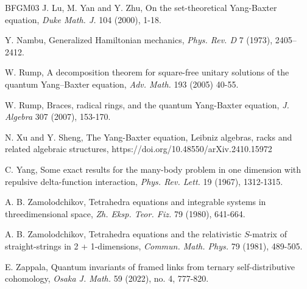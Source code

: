 \documentclass[a4paper,reqno,10pt]{amsart}
\theoremstyle{plain}
\theoremstyle{definition}
\theoremstyle{remark}
\begin{document}
\begin{thebibliography}{BFGM03}
 J. Lu, M. Yan and Y. Zhu, On the set-theoretical Yang-Baxter equation, {\em Duke Math. J.} 104 (2000), 1-18.

 Y. Nambu, Generalized Hamiltonian mechanics, {\em Phys. Rev. D} 7 (1973), 2405–2412.


 W. Rump, A decomposition theorem for square-free unitary solutions of the quantum Yang–Baxter equation, {\em Adv.
Math.} 193 (2005) 40-55.

 W. Rump, Braces, radical rings, and the quantum Yang-Baxter equation, {\em J. Algebra} 307 (2007), 153-170.


 N. Xu and Y. Sheng, The Yang-Baxter equation, Leibniz algebras, racks and related algebraic structures, 
https://doi.org/10.48550/arXiv.2410.15972

  C. Yang, Some exact results for the many-body problem in one dimension with repulsive delta-function interaction, {\em Phys. Rev. Lett.} 19 (1967), 1312-1315.

 A. B. Zamolodchikov, Tetrahedra equations and integrable systems in threedimensional space, {\em Zh. Eksp. Teor. Fiz.} 79 (1980), 641-664.

 A. B. Zamolodchikov, Tetrahedra equations and the relativistic $S$-matrix of straight-strings
in 2 + 1-dimensions, {\em Commun. Math. Phys.} 79 (1981), 489-505. 

 E. Zappala, Quantum invariants of framed links from ternary self-distributive cohomology, {\em Osaka J. Math.} 59 (2022), no. 4, 777-820.


\end{thebibliography}
\end{document}
